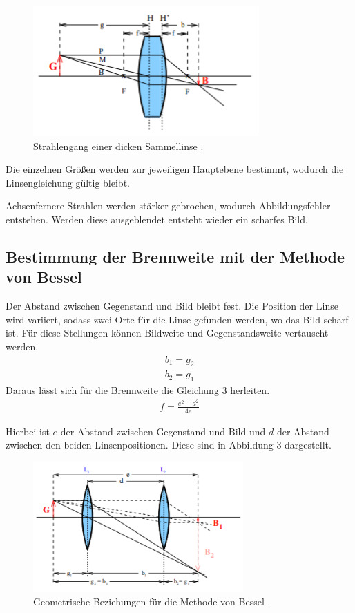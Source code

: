 \begin{figure}[H]
  \centering
  \includegraphics[height=5cm]{dickelinse.PNG}
  \caption{Strahlengang einer dicken Sammellinse \cite{sample}.}
  \label{fig:biegungbild1}
\end{figure}

Die einzelnen Größen werden zur jeweiligen Hauptebene bestimmt, wodurch die Linsengleichung
gültig bleibt.

Achsenfernere Strahlen werden stärker gebrochen, wodurch Abbildungsfehler entstehen. Werden diese
ausgeblendet entsteht wieder ein scharfes Bild.

\subsection{Bestimmung der Brennweite mit der Methode von Bessel}
Der Abstand zwischen Gegenstand und Bild bleibt fest. Die Position der Linse wird variiert,
sodass zwei Orte für die Linse gefunden werden, wo das Bild scharf ist. Für diese
Stellungen können Bildweite und Gegenstandsweite vertauscht werden.
\begin{align*}
  b_1 = g_2 \\
  b_2 = g_1
\end{align*}
Daraus lässt sich für die Brennweite  die Gleichung 3 herleiten.
\begin{align}
  f = \frac{e^2 - d^2}{4e}
\end{align}

Hierbei ist $e$ der Abstand zwischen Gegenstand und Bild und $d$ der Abstand zwischen den
beiden Linsenpositionen. Diese sind in Abbildung 3 dargestellt.

\begin{figure}[H]
  \centering
  \includegraphics[height=5cm]{bessel.PNG}
  \caption{Geometrische Beziehungen für die Methode von Bessel \cite{sample}.}
  \label{fig:biegungbild1}
\end{figure}

